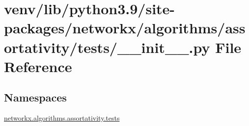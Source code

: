 \hypertarget{venv_2lib_2python3_89_2site-packages_2networkx_2algorithms_2assortativity_2tests_2____init_____8py}{}\section{venv/lib/python3.9/site-\/packages/networkx/algorithms/assortativity/tests/\+\_\+\+\_\+init\+\_\+\+\_\+.py File Reference}
\label{venv_2lib_2python3_89_2site-packages_2networkx_2algorithms_2assortativity_2tests_2____init_____8py}
\subsection*{Namespaces}
\begin{DoxyCompactItemize}
\item 
 \hyperlink{namespacenetworkx_1_1algorithms_1_1assortativity_1_1tests}{networkx.\+algorithms.\+assortativity.\+tests}
\end{DoxyCompactItemize}
